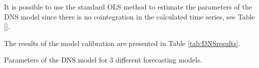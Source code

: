         It is possible to use the standard OLS method to estimate the parameters of the DNS model since there is no cointegration in the calculated time series, see Table \ref{}. 

        The results of the model calibration are presented in Table \ref{tab:DNSresults}.
        \begin{table}
            \label{tab:DNSresults}
            \centering
            
            \caption{Parameters of the DNS model for 3 different forecasting models.}
        \end{table}
